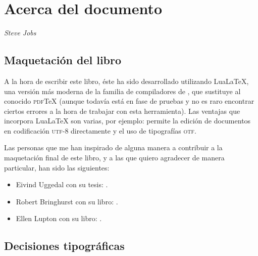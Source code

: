 \chapter{Acerca del documento}

\begin{quotation}
\small{
}
\end{quotation}

\begin{flushright}
\small{\textit{Steve Jobs}}
\end{flushright}

\section{Maquetación del libro}

A la hora de escribir este libro, éste ha sido desarrollado utilizando Lua\LaTeX, una versión más moderna de la familia de compiladores de \LaTeXe{}, que sustituye al conocido \textsc{pdf}\TeX{} (aunque todavía está en fase de pruebas y no es raro encontrar ciertos errores a la hora de trabajar con esta herramienta). Las ventajas que incorpora Lua\LaTeX{} son varias, por ejemplo: permite la edición de documentos en codificación \textsc{utf-8} directamente y el uso de tipografías \textsc{otf}.

Las personas que me han inspirado de alguna manera a contribuir a la maquetación final de este libro, y a las que quiero agradecer de manera particular, han sido las siguientes:

\begin{itemize}
\item Eivind Uggedal con su tesis:  \cite{libro:social-navigation}.
\item Robert Bringhurst con su libro:  \cite{libro:bringhurst}.
\item Ellen Lupton con su libro:  \cite{libro:lupton}.
\end{itemize}

\section{Decisiones tipográficas}

